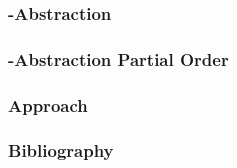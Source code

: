 \documentclass[%
10pt,
dvipsnames,
]{beamer}
\begin{document}
\begin{frame}
	\frametitle{\qvasr-Abstraction}
\end{frame}

\begin{frame}
	\frametitle{\qvasr-Abstraction Partial Order}
	\resizebox{0.4\textwidth}{!}{}
\end{frame}


\begin{frame}[t]
	\frametitle{\qvasrs}
\end{frame}

\begin{frame}[t]
	\frametitle{Approach}
		\nocite{DBLP:conf/cav/SilvermanK19}
	\resizebox{11cm}{!}{}
\end{frame}

\begin{frame}
	\label{slide:bibliography}
	\frametitle{Bibliography}
	\fontsize{10}{10}\selectfont
	
	\nocite{DBLP:conf/cav/SilvermanK19} \nocite{DBLP:conf/cav/SilvermanK19}
	
\end{frame}
\end{document}
